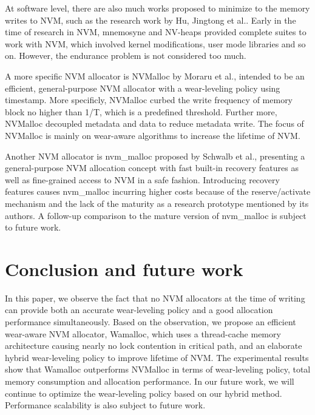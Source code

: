 \documentclass[10pt, conference, compsocconf]{IEEEtran}
\begin{document}
At software level, there are also much works proposed to minimize to the memory writes to NVM, 
such as the research work by Hu, Jingtong et al.\cite{hu2013software}.
Early in the time of research in NVM, 
mnemosyne\cite{volos2011mnemosyne} and NV-heaps\cite{coburn2011nv} provided complete suites to work with NVM, 
which involved kernel modifications, user mode libraries and so on.
However, the endurance problem is not considered too much.

A more specific NVM allocator is NVMalloc by Moraru et al.\cite{moraru2013consistent},
intended to be an efficient, general-purpose NVM allocator with a wear-leveling policy using timestamp.
More specificly, NVMalloc curbed the write frequency of memory block no higher than 1/T, which is a predefined threshold.
Further more, NVMalloc decoupled metadata and data to reduce metadata write.
The focus of NVMalloc is mainly on wear-aware algorithms to increase the lifetime of NVM.

Another NVM allocator is nvm\_malloc proposed by Schwalb et al.\cite{schwalbnvm},
presenting a general-purpose NVM allocation concept with fast built-in recovery features
as well as fine-grained access to NVM in a safe fashion.
Introducing recovery features causes nvm\_malloc incurring higher costs
because of the reserve/activate mechanism and the lack of the maturity as a research prototype mentioned by its authors.
A follow-up comparison to the mature version of nvm\_malloc is subject to future work.

\section{Conclusion and future work}

In this paper, we observe the fact that
no NVM allocators at the time of writing 
can provide both an accurate wear-leveling policy and a good allocation performance simultaneously.
Based on the observation, we propose an efficient wear-aware NVM allocator, Wamalloc,
which uses a thread-cache memory architecture causing nearly no lock contention in critical path,
and an elaborate hybrid wear-leveling policy to improve lifetime of NVM.
The experimental results show that
Wamalloc outperforms NVMalloc in terms of wear-leveling policy, total memory consumption and allocation performance.
In our future work, we will continue to optimize the wear-leveling policy based on our hybrid method.
Performance scalability is also subject to future work.
\end{document}
